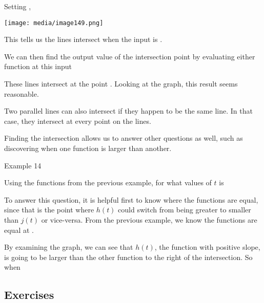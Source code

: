 Setting ,

\texttt{[image: media/image149.png]}

This tells us the lines intersect when the input is .

We can then find the output value of the intersection point by
evaluating either function at this input

These lines intersect at the point . Looking at the graph, this result
seems reasonable.

Two parallel lines can also intersect if they happen to be the same
line. In that case, they intersect at every point on the lines.

Finding the intersection allows us to answer other questions as well,
such as discovering when one function is larger than another.

Example 14

Using the functions from the previous example, for what values of
$t$ is

To answer this question, it is helpful first to know where the functions
are equal, since that is the point where $h(t)$ could switch from
being greater to smaller than $j(t)$ or vice-versa. From the
previous example, we know the functions are equal at .

By examining the graph, we can see that $h(t)$, the function with
positive slope, is going to be larger than the other function to the
right of the intersection. So when


\subsection{Exercises}
\label{1-4-exercises}

%


